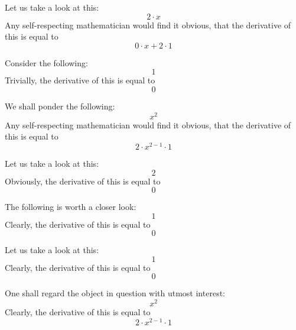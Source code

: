 \documentclass{article}
\begin{document}
Let us take a look at this:
\begin{equation}
2 \cdot x 
\end{equation}
Any self-respecting mathematician would find it obvious, that the derivative of this is equal to
\begin{equation}
0 \cdot x + 2 \cdot 1 
\end{equation}

Consider the following:
\begin{equation}
1 
\end{equation}
Trivially, the derivative of this is equal to
\begin{equation}
0 
\end{equation}

We shall ponder the following:
\begin{equation}
x ^{2 } 
\end{equation}
Any self-respecting mathematician would find it obvious, that the derivative of this is equal to
\begin{equation}
2 \cdot x ^{2 - 1 } \cdot 1 
\end{equation}

Let us take a look at this:
\begin{equation}
2 
\end{equation}
Obviously, the derivative of this is equal to
\begin{equation}
0 
\end{equation}

The following is worth a closer look:
\begin{equation}
1 
\end{equation}
Clearly, the derivative of this is equal to
\begin{equation}
0 
\end{equation}

Let us take a look at this:
\begin{equation}
1 
\end{equation}
Clearly, the derivative of this is equal to
\begin{equation}
0 
\end{equation}

One shall regard the object in question with utmost interest:
\begin{equation}
x ^{2 } 
\end{equation}
Clearly, the derivative of this is equal to
\begin{equation}
2 \cdot x ^{2 - 1 } \cdot 1 
\end{equation}
\end{document}
